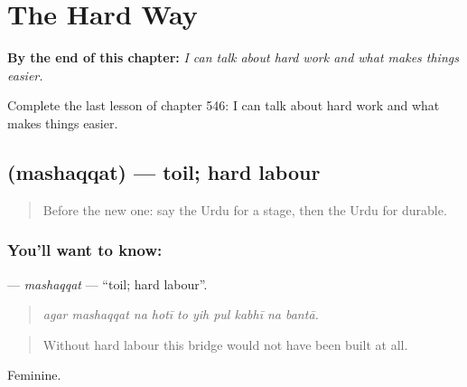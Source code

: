 
\chapter{The Hard Way}
\label{ch:ur-the-hard-way}

\begin{chapteropening}
\textbf{By the end of this chapter:} \emph{I can talk about hard work and what makes things easier.}

Complete the last lesson of chapter 546: I can talk about hard work and what makes things easier.
\end{chapteropening}

\section[\texorpdfstring{\ur{مشقت} (mashaqqat)}{مشقت (mashaqqat)}]{ (mashaqqat) — toil; hard labour}

\label{lesson:UR-C546-mashaqqat}



\begin{quote}
Before the new one: say the Urdu for a stage, then the Urdu for durable.
\end{quote}

\subsection*{You'll want to know: }
\textbf{} — \emph{mashaqqat} — \textquotedblleft{}toil; hard labour\textquotedblright{}.

\begin{quote}
         
\end{quote}

\begin{quote}
\emph{agar mashaqqat na hotī to yih pul kabhī na bantā.}
\end{quote}

\begin{quote}
Without hard labour this bridge would not have been built at all.
\end{quote}

Feminine.

